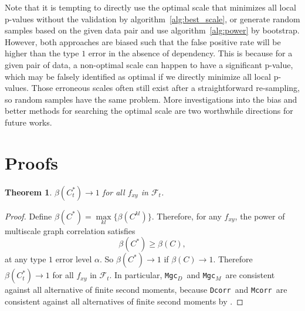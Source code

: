 \documentclass[11pt]{article}
\providecommand{\sct}[1]{{\sc \texttt{#1}}}
\providecommand{\mc}[1]{\mathcal{#1}}
\newcommand{\G}{C}
\newcommand{\Mgc}{\sct{Mgc}}
\newcommand{\Mgcd}{\sct{Mgc$_D$}}
\newcommand{\Mgcm}{\sct{Mgc$_M$}}
\newcommand{\Dcorr}{\sct{Dcorr}}
\newcommand{\Mcorr}{\sct{Mcorr}}
\newtheorem{appThm}{Theorem}
\begin{document}
Note that it is tempting to directly use the optimal scale that minimizes all local p-values without the validation by algorithm~\ref{alg:best_scale}, or generate random samples based on the given data pair and use algorithm~\ref{alg:power} by bootstrap. However, both approaches are biased such that the false positive rate will be higher than the type $1$ error in the absence of dependency. This is because for a given pair of data, a non-optimal scale can happen to have a significant p-value, which may be falsely identified as optimal if we directly minimize all local p-values. Those erroneous scales often still exist after a straightforward re-sampling, so random samples have the same problem. More investigations into the bias and better methods for searching the optimal scale are two worthwhile directions for future works.


\section{Proofs}
\label{appen:proofs}
\begin{appThm}
$\beta(\G_t^*) \rightarrow 1$ for all $f_{xy}$ in $\mc{F}_t$.
\end{appThm}
\begin{proof}
Define $\beta(\G^{*})=\underset{kl}{\max}\{\beta(\G^{kl})\}$. Therefore, for any $f_{xy}$, the power of multiscale graph correlation satisfies
\begin{equation}
\beta(\G^*) \geq \beta(\G),
\end{equation}
at any type $1$ error level $\alpha$. So $\beta(\G^{*}) \rightarrow 1$ if $\beta(\G) \rightarrow 1$.
% 
Therefore $\beta(\G_t^*) \rightarrow 1$ for all $f_{xy}$ in $\mc{F}_t$. In particular, \Mgcd~and \Mgcm~are consistent against all alternative of finite second moments, because \Dcorr~and \Mcorr~are consistent against all alternatives of finite second moments by \cite{SzekelyRizzoBakirov2007, SzekelyRizzo2013a}.
\end{proof}
\end{document}

